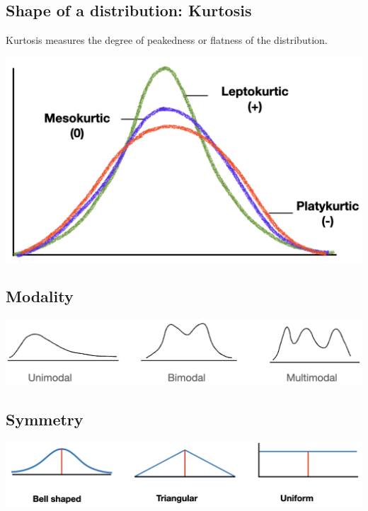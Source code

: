 \documentclass[
]{article}
\begin{document}
\hypertarget{shape-of-a-distribution-kurtosis}{%
\subsection{Shape of a distribution:
Kurtosis}\label{shape-of-a-distribution-kurtosis}}

Kurtosis measures the degree of peakedness or flatness of the
distribution.

\begin{center}\includegraphics[width=1\linewidth,height=0.6\textheight]{kurtosis1} \end{center}

\hypertarget{modality}{%
\subsection{Modality}\label{modality}}

\begin{center}\includegraphics[width=1.3\linewidth,height=0.6\textheight]{modality} \end{center}

\hypertarget{symmetry}{%
\subsection{Symmetry}\label{symmetry}}

\begin{center}\includegraphics[width=1.3\linewidth,height=0.6\textheight]{symmetry} \end{center}
\end{document}
